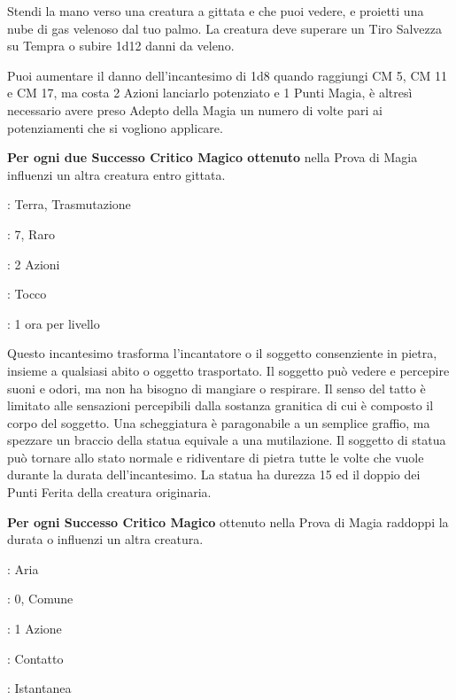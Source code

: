 \begin{multicols}{2}
Stendi la mano verso una creatura a gittata e che puoi vedere, e proietti una nube di gas velenoso dal tuo palmo. La creatura deve superare un Tiro Salvezza su Tempra o subire 1d12 danni da veleno.

Puoi aumentare il danno dell'incantesimo di 1d8 quando raggiungi CM 5, CM 11 e CM 17, ma costa 2 Azioni lanciarlo potenziato e 1 Punti Magia, è altresì necessario avere preso Adepto della Magia un numero di volte pari ai potenziamenti che si vogliono applicare.

\textbf{Per ogni due Successo Critico Magico ottenuto} nella Prova di Magia influenzi un altra creatura entro gittata.


\noindent\colorbox{OBSSgold!10}{
\begin{minipage}{0.95\linewidth}
\begin{description}[noitemsep, topsep=0pt, parsep=0pt, partopsep=0pt, leftmargin=0cm, labelwidth=1.3cm]
	\item[\textbf{Lista}]: Terra, Trasmutazione
	\item[\textbf{Livello}]: 7, Raro
	\item[\textbf{Lancio}]: 2 Azioni
	\item[\textbf{Gittata}]: Tocco
	\item[\textbf{Durata}]: 1 ora per livello
\end{description}
\end{minipage}}\smallskip

Questo incantesimo trasforma l'incantatore o il soggetto consenziente in pietra, insieme a qualsiasi abito o oggetto trasportato. Il soggetto può vedere e percepire suoni e odori, ma non ha bisogno di mangiare o respirare. Il senso del tatto è limitato alle sensazioni percepibili dalla sostanza granitica di cui è composto il corpo del soggetto. Una scheggiatura è paragonabile a un semplice graffio, ma spezzare un braccio della statua equivale a una mutilazione. Il soggetto di statua può tornare allo stato normale e ridiventare di pietra tutte le volte che vuole durante la durata dell'incantesimo. La statua ha durezza 15 ed il doppio dei Punti Ferita della creatura originaria.

\textbf{Per ogni Successo Critico Magico} ottenuto nella Prova di Magia raddoppi la durata o influenzi un altra creatura.

\noindent\colorbox{OBSSgold!10}{
\begin{minipage}{0.95\linewidth}
\begin{description}[noitemsep, topsep=0pt, parsep=0pt, partopsep=0pt, leftmargin=0cm, labelwidth=1.3cm]
	\item[\textbf{Lista}]: Aria
	\item[\textbf{Livello}]: 0, Comune
	\item[\textbf{Lancio}]: 1 Azione
	\item[\textbf{Gittata}]: Contatto
	\item[\textbf{Durata}]: Istantanea
\end{description}
\end{minipage}}\smallskip


\end{multicols}
